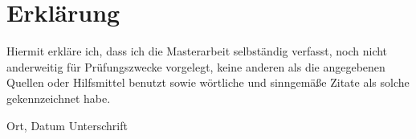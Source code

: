 \chapter*{Erklärung}
Hiermit erkläre ich, dass ich die Masterarbeit selbständig verfasst, noch nicht anderweitig für Prüfungszwecke vorgelegt, keine anderen als die angegebenen Quellen oder Hilfsmittel benutzt sowie wörtliche und sinngemäße Zitate als solche gekennzeichnet habe.
\vspace{3cm}

Ort, Datum \hspace{5cm} Unterschrift


